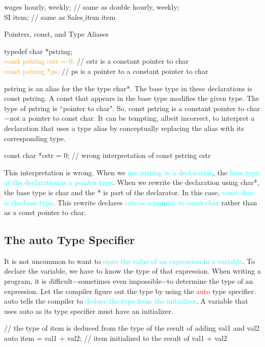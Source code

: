 \documentclass[12pt,a4paper]{article}
\begin{document}
wages hourly, weekly; // same as double hourly, weekly; \\
SI item; // same as Sales$\_$item item

Pointers, const, and Type Aliases

typedef char *pstring; \\
\textcolor{orange}{const pstring cstr = 0;} // cstr is a constant pointer to char \\
\textcolor{orange}{const pstring *ps;} // ps is a pointer to a constant pointer to char 

pstring is an alias for the the type char*. The base type in these declarations is const pstring. A const that appears in the base type modifies the given type. The type of pstring is ``pointer to char". So, const pstring is a constant pointer to char$-$not a pointer to const char. It can be tempting, albeit incorrect, to interpret a declaration that uses a type alias by conceptually replacing the alias with its corresponding type.

const char *cstr = 0; // wrong interpretation of const pstring cstr

This interpretation is wrong. When we \textcolor{cyan}{use pstring in a declaration}, the \textcolor{cyan}{base type of the declaration is a pointer type}. When we rewrite the declaration using char*, the base type is char and the * is part of the declarator. In this case, \textcolor{cyan}{const char is the base type}. This rewrite declares \textcolor{cyan}{cstr as a pointer to const char} rather than as a const pointer to char.







\subsection{The auto Type Specifier}
It is not uncommon to want to \textcolor{cyan}{store the value of an expression in a variable}. To declare the variable, we have to know the type of that expression. When writing a program, it is difficult$-$sometimes even impossible$-$to determine the type of an expression. Let the compiler figure out the type by using the \textcolor{red}{auto} type specifier. auto tells the compiler to \textcolor{cyan}{deduce the type from the initializer}. A variable that uses auto as its type specifier must have an initializer.

// the type of item is deduced from the type of the result of adding val1 and val2 \\
auto item = val1 + val2; // item initialized to the result of val1 + val2
\end{document}
